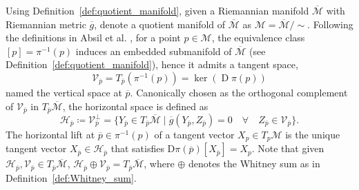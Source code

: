 \begin{definition}\label{def:horizontal_vertical_space}
    Using Definition~\ref{def:quotient_manifold}, given a Riemannian manifold $\overline{\mathcal{M}}$ with Riemannian metric $\overline{g}$, denote a quotient manifold of $\overline{\mathcal{M}}$ as $\mathcal{M}=\overline{\mathcal{M}}/\sim$. Following the definitions in Absil et al. \cite[p.~43]{AbsilMahonySepulchre2008}, for a point $p\in \mathcal{M}$, the equivalence class $[p]=\pi^{-1}(p)$ induces an embedded submanifold of $\overline{\mathcal{M}}$ (see Definition~\ref{def:quotient_manifold}), hence it admits a tangent space,
    \begin{equation*}
        \mathcal{V}_{\overline{p}}=T_{\overline{p}}(\pi^{-1}(p))=\operatorname{ker}(\operatorname{D}\pi(p))
    \end{equation*}
    \cite[p.~4]{JensenZimmermann2024} named the \textup{vertical space} at $\overline{p}$. Canonically chosen as the orthogonal complement of $\mathcal{V}_{\overline{p}}$ in $T_{\overline{p}}\overline{\mathcal{M}}$, the \textup{horizontal space} \cite[p.~48]{AbsilMahonySepulchre2008} is defined as %
    \begin{equation*}
        \mathcal{H}_{\overline{p}}\coloneqq \mathcal{V}_{\overline{p}}^\perp=\{Y_{\overline{p}}\in T_{\overline{p}}\overline{\mathcal{M}} \;|\; \overline{g}(Y_{\overline{p}},Z_{\overline{p}})=0\quad\forall\quad Z_{\overline{p}}\in \mathcal{V}_{\overline{p}} \}.
    \end{equation*}
    The \textup{horizontal lift} at $\overline{p}\in\pi^{-1}(p)$ of a tangent vector $X_{p}\in T_{p}\mathcal{M}$ is the unique tangent vector $X_{\overline{p}}\in \mathcal{H}_{\overline{p}}$ that satisfies $\mathrm{D}\pi(\overline{p})[{X}_{\overline{p}}]=X_p$. Note that given $\mathcal{H}_{\overline{p}}, \mathcal{V}_{\overline{p}}\in T_{\overline{p}}\overline{\mathcal{M}}$, $\mathcal{H}_{\overline{p}}\oplus \mathcal{V}_{\overline{p}}=T_{\overline{p}}\overline{\mathcal{M}}$, where $\oplus$ denotes the Whitney sum as in Definition~\ref{def:Whitney_sum}. 
\end{definition}

